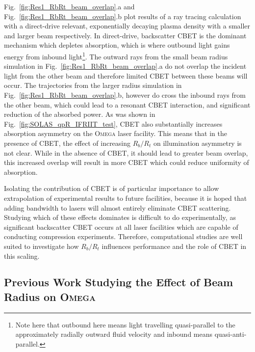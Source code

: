 Fig.~\ref{fig:Res1_RbRt_beam_overlap}.a and Fig.~\ref{fig:Res1_RbRt_beam_overlap}.b plot results of a ray tracing calculation with a direct-drive relevant, exponentially decaying plasma density with a smaller and larger beam respectively.
In direct-drive, backscatter \ac{CBET} is the dominant mechanism which depletes absorption, which is where outbound light gains energy from inbound light\footnote{Note here that outbound here means light travelling quasi-parallel to the approximately radially outward fluid velocity and inbound means quasi-anti-parallel.}.
The outward rays from the small beam radius simulation in Fig.~\ref{fig:Res1_RbRt_beam_overlap}.a do not overlap the incident light from the other beam and therefore limited \ac{CBET} between these beams will occur.
The trajectories from the larger radius simulation in Fig.~\ref{fig:Res1_RbRt_beam_overlap}.b, however do cross the inbound rays from the other beam, which could lead to a resonant \ac{CBET} interaction, and significant reduction of the absorbed power.
As was shown in Fig.~\ref{fig:SOLAS_qpR_IFRIIT_test}, \ac{CBET} also substantially increases absorption asymmetry on the \textsc{Omega} laser facility.
This means that in the presence of \ac{CBET}, the effect of increasing $R_b/R_t$ on illumination asymmetry is not clear.
While in the absence of \ac{CBET}, it should lead to greater beam overlap, this increased overlap will result in more \ac{CBET} which could reduce uniformity of absorption.

Isolating the contribution of \ac{CBET} is of particular importance to allow extrapolation of experimental results to future facilities, because it is hoped that adding bandwidth to lasers will almost entirely eliminate \ac{CBET} scattering.
Studying which of these effects dominates is difficult to do experimentally, as significant backscatter \ac{CBET} occurs at all laser facilities which are capable of conducting compression experiments.
Therefore, computational studies are well suited to investigate how $R_b/R_t$ influences performance and the role of \ac{CBET} in this scaling.


\subsection{Previous Work Studying the Effect of Beam Radius on \textsc{Omega}}%
\label{sec:Res1_OMEGA_stat_modelling_RbRt}

